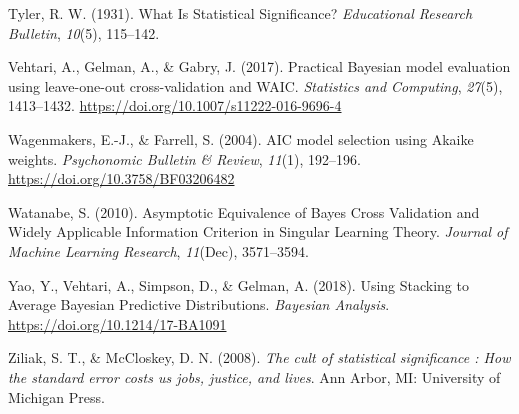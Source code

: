 \documentclass[
  english,
  doc]{apa6}
\newlength{\cslhangindent}
\newenvironment{cslreferences}%
  {\setlength{\parindent}{0pt}%
  \everypar{\setlength{\hangindent}{\cslhangindent}}\ignorespaces}%
  {\par}
\begin{document}
\begin{cslreferences}
\leavevmode\hypertarget{ref-tylerWhatStatisticalSignificance1931}{}%
Tyler, R. W. (1931). What Is Statistical Significance? \emph{Educational Research Bulletin}, \emph{10}(5), 115--142.

\leavevmode\hypertarget{ref-Vehtari2017}{}%
Vehtari, A., Gelman, A., \& Gabry, J. (2017). Practical Bayesian model evaluation using leave-one-out cross-validation and WAIC. \emph{Statistics and Computing}, \emph{27}(5), 1413--1432. \url{https://doi.org/10.1007/s11222-016-9696-4}

\leavevmode\hypertarget{ref-WagenmakersAICmodelselection2004}{}%
Wagenmakers, E.-J., \& Farrell, S. (2004). AIC model selection using Akaike weights. \emph{Psychonomic Bulletin \& Review}, \emph{11}(1), 192--196. \url{https://doi.org/10.3758/BF03206482}

\leavevmode\hypertarget{ref-WatanabeAsymptoticEquivalenceBayes2010}{}%
Watanabe, S. (2010). Asymptotic Equivalence of Bayes Cross Validation and Widely Applicable Information Criterion in Singular Learning Theory. \emph{Journal of Machine Learning Research}, \emph{11}(Dec), 3571--3594.

\leavevmode\hypertarget{ref-YaoUsingStackingAverage2018}{}%
Yao, Y., Vehtari, A., Simpson, D., \& Gelman, A. (2018). Using Stacking to Average Bayesian Predictive Distributions. \emph{Bayesian Analysis}. \url{https://doi.org/10.1214/17-BA1091}

\leavevmode\hypertarget{ref-ziliakCultStatisticalSignificance2008}{}%
Ziliak, S. T., \& McCloskey, D. N. (2008). \emph{The cult of statistical significance : How the standard error costs us jobs, justice, and lives}. Ann Arbor, MI: University of Michigan Press.
\end{cslreferences}

\endgroup
\end{document}
